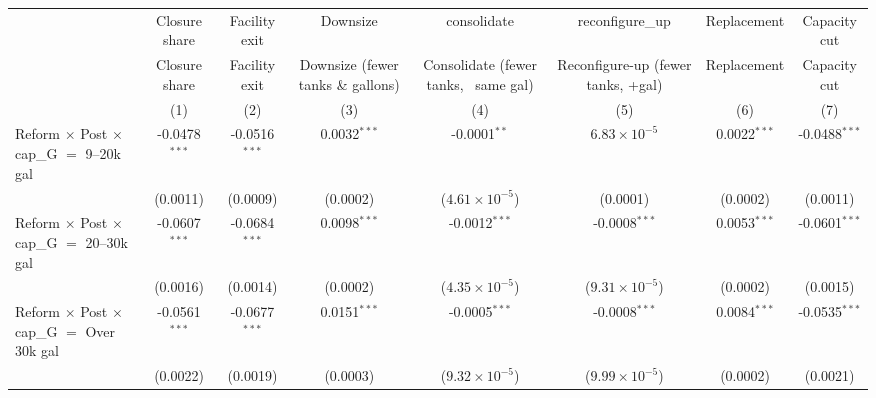 
\begingroup
\centering
\begin{tabular}{lccccccc}
   \toprule
                                                            & Closure share   & Facility exit   & Downsize                           & consolidate                          & reconfigure\_up                    & Replacement     & Capacity cut\\  
                                                            & Closure share   & Facility exit   & Downsize (fewer tanks \& gallons)  & Consolidate (fewer tanks, ~same gal) & Reconfigure-up (fewer tanks, +gal) & Replacement     & Capacity cut \\   
                                                            & (1)             & (2)             & (3)                                & (4)                                  & (5)                                & (6)             & (7)\\  
   \midrule 
   Reform $\times$ Post $\times$ cap\_G $=$ 9--20k gal      & -0.0478$^{***}$ & -0.0516$^{***}$ & 0.0032$^{***}$                     & -0.0001$^{**}$                       & $6.83\times 10^{-5}$               & 0.0022$^{***}$  & -0.0488$^{***}$\\   
                                                            & (0.0011)        & (0.0009)        & (0.0002)                           & ($4.61\times 10^{-5}$)               & (0.0001)                           & (0.0002)        & (0.0011)\\   
   Reform $\times$ Post $\times$ cap\_G $=$ 20--30k gal     & -0.0607$^{***}$ & -0.0684$^{***}$ & 0.0098$^{***}$                     & -0.0012$^{***}$                      & -0.0008$^{***}$                    & 0.0053$^{***}$  & -0.0601$^{***}$\\   
                                                            & (0.0016)        & (0.0014)        & (0.0002)                           & ($4.35\times 10^{-5}$)               & ($9.31\times 10^{-5}$)             & (0.0002)        & (0.0015)\\   
   Reform $\times$ Post $\times$ cap\_G $=$ Over 30k gal    & -0.0561$^{***}$ & -0.0677$^{***}$ & 0.0151$^{***}$                     & -0.0005$^{***}$                      & -0.0008$^{***}$                    & 0.0084$^{***}$  & -0.0535$^{***}$\\   
                                                            & (0.0022)        & (0.0019)        & (0.0003)                           & ($9.32\times 10^{-5}$)               & ($9.99\times 10^{-5}$)             & (0.0002)        & (0.0021)\\   

\end{tabular}
